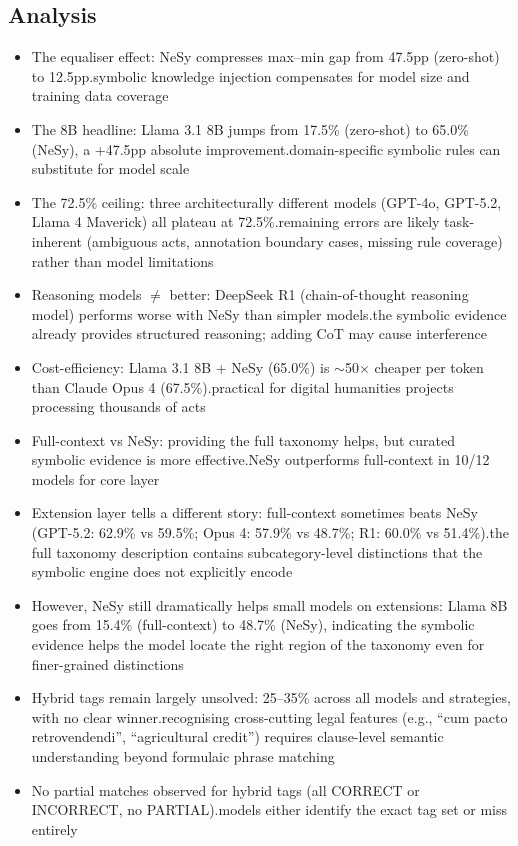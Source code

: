 \documentclass[10pt, a4paper]{article}
\begin{document}
\subsection{Analysis}

\begin{itemize}
\item The equaliser effect: NeSy compresses max--min gap from 47.5pp (zero-shot) to 12.5pp.symbolic knowledge injection compensates for model size and training data coverage
\item The 8B headline: Llama 3.1 8B jumps from 17.5\% (zero-shot) to 65.0\% (NeSy), a +47.5pp absolute improvement.domain-specific symbolic rules can substitute for model scale
\item The 72.5\% ceiling: three architecturally different models (GPT-4o, GPT-5.2, Llama 4 Maverick) all plateau at 72.5\%.remaining errors are likely task-inherent (ambiguous acts, annotation boundary cases, missing rule coverage) rather than model limitations
\item Reasoning models $\neq$ better: DeepSeek R1 (chain-of-thought reasoning model) performs worse with NeSy than simpler models.the symbolic evidence already provides structured reasoning; adding CoT may cause interference
\item Cost-efficiency: Llama 3.1 8B + NeSy (65.0\%) is $\sim$50$\times$ cheaper per token than Claude Opus 4 (67.5\%).practical for digital humanities projects processing thousands of acts
\item Full-context vs NeSy: providing the full taxonomy helps, but curated symbolic evidence is more effective.NeSy outperforms full-context in 10/12 models for core layer
\item Extension layer tells a different story: full-context sometimes beats NeSy (GPT-5.2: 62.9\% vs 59.5\%; Opus 4: 57.9\% vs 48.7\%; R1: 60.0\% vs 51.4\%).the full taxonomy description contains subcategory-level distinctions that the symbolic engine does not explicitly encode
\item However, NeSy still dramatically helps small models on extensions: Llama 8B goes from 15.4\% (full-context) to 48.7\% (NeSy), indicating the symbolic evidence helps the model locate the right region of the taxonomy even for finer-grained distinctions
\item Hybrid tags remain largely unsolved: 25--35\% across all models and strategies, with no clear winner.recognising cross-cutting legal features (e.g., ``cum pacto retrovendendi'', ``agricultural credit'') requires clause-level semantic understanding beyond formulaic phrase matching
\item No partial matches observed for hybrid tags (all CORRECT or INCORRECT, no PARTIAL).models either identify the exact tag set or miss entirely
\end{itemize}
\end{document}
